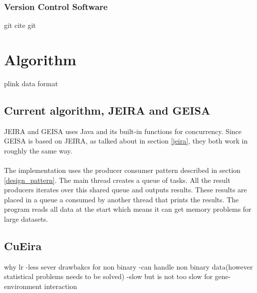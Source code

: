 \documentclass[10pt,a4paper]{report}
\begin{document}
\subsection{Version Control Software}
git
cite git

\clearpage
\chapter{Algorithm}






plink data format

\section{Current algorithm, JEIRA and GEISA}
JEIRA and GEISA uses Java and its built-in functions for concurrency. Since GEISA is based on JEIRA, as talked about in section \ref{jeira}, they both work in roughly the same way.\\
\\
The implementation uses the producer consumer pattern described in section \ref{design_pattern}. The main thread creates a queue of tasks. All the result producers iterates over this shared queue and outputs results. These results are placed in a queue a consumed by another thread that prints the results. The program reads all data at the start which means it can get memory problems for large datasets.



\section{CuEira}


why lr
-less sever drawbakcs for non binary
-can handle non binary data(however statistical problems needs to be solved)
-slow but is not too slow for gene-environment interaction
\end{document}
